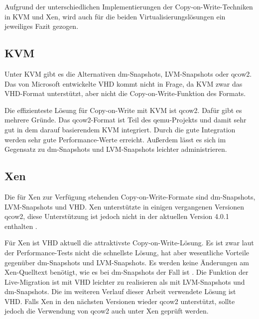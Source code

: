 Aufgrund der unterschiedlichen Implementierungen der Copy-on-Write-Techniken in KVM und Xen, wird auch für die beiden Virtualisierungslösungen ein jeweiliges Fazit gezogen.

\subsection{KVM}
Unter KVM gibt es die Alternativen dm-Snapshots, LVM-Snapshots oder qcow2. Das von Microsoft entwickelte VHD kommt nicht in Frage, da KVM zwar das VHD-Format unterstützt, aber nicht die Copy-on-Write-Funktion des Formats. 

Die effizienteste Lösung für Copy-on-Write mit KVM ist qcow2. Dafür gibt es mehrere Gründe. Das qcow2-Format ist Teil des qemu-Projekts und damit sehr gut in dem darauf basierendem KVM integriert. Durch die gute Integration werden sehr gute Performance-Werte erreicht. Außerdem lässt es sich im Gegensatz zu dm-Snapshots und LVM-Snapshots leichter administrieren.

\subsection{Xen}
Die für Xen zur Verfügung stehenden Copy-on-Write-Formate sind dm-Snapshots, LVM-Snapshots und VHD. Xen unterstützte in einigen vergangenen Versionen qcow2, diese Unterstützung ist jedoch nicht in der aktuellen Version 4.0.1 enthalten \cite{qcow2support}. 

Für Xen ist VHD aktuell die attraktivste Copy-on-Write-Lösung. Es ist zwar laut der Performance-Tests nicht die schnellste Lösung, hat aber wesentliche Vorteile gegenüber dm-Snapshots und LVM-Snapshots. Es werden keine Änderungen am Xen-Quelltext benötigt, wie es bei dm-Snapshots der Fall ist \cite{racecondition}. Die Funktion der Live-Migration ist mit VHD leichter zu realisieren als mit LVM-Snapshots und dm-Snapshots. Die im weiteren Verlauf dieser Arbeit verwendete Lösung ist VHD. Falls Xen in den nächsten Versionen wieder qcow2 unterstützt, sollte jedoch die Verwendung von qcow2 auch unter Xen geprüft werden. 